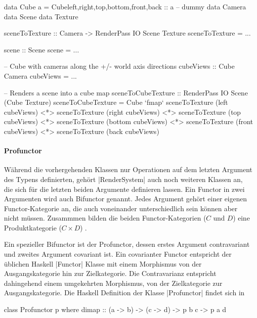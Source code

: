 \begin{haskell}[label={lst:rendersystem-applicative-beispiel},caption={Applicative RenderSystem Beispiel}]
data Cube a = Cube{left,right,top,bottom,front,back :: a}
-- dummy
data Camera
data Scene
data Texture

sceneToTexture :: Camera -> RenderPass IO Scene Texture
sceneToTexture = ...

scene :: Scene
scene = ...

-- Cube with cameras along the +/- world axis directions
cubeViews :: Cube Camera
cubeViews = ...

-- Renders a scene into a cube map
sceneToCubeTexture :: RenderPass IO Scene (Cube Texture)
sceneToCubeTexture = Cube
	`fmap` sceneToTexture (left cubeViews)
	<*> sceneToTexture (right  cubeViews)
	<*> sceneToTexture (top    cubeViews)
	<*> sceneToTexture (bottom cubeViews)
	<*> sceneToTexture (front  cubeViews)
	<*> sceneToTexture (back   cubeViews)
\end{haskell}



\paragraph{Profunctor}
Während die vorhergehenden Klassen nur Operationen auf dem letzten Argument des Typens definierten, gehört  |RenderSystem| auch noch weiteren Klassen an, die sich für die letzten beiden Argumente definieren lassen. Ein Functor in zwei Argumenten wird auch Bifunctor genannt. Jedes Argument gehört einer eigenen Functor-Kategorie an, die auch voneinander unterschiedlich sein können aber nicht müssen. Zusammmen bilden die beiden Functor-Kategorien ($C$ und $D$) eine Produktkategorie ($C \times D$) \parencite{MacLane1998}.

Ein spezieller Bifunctor ist der Profunctor, dessen erstes Argument contravariant und zweites Argument covariant ist. Ein covarianter Functor entspricht der üblichen Haskell |Functor| Klasse mit einem Morphismus von der Ausgangskategorie hin zur Zielkategorie. Die Contravarianz entspricht dahingehend einem umgekehrten Morphismus, von der Zielkategorie zur Ausgangskategorie. Die Haskell Definition der Klasse |Profunctor| findet sich in 

\begin{haskell}[label={lst:class-profunctor},caption={Profunctor Klasse\protect\footnotemark},nolol]
class Profunctor p where
  dimap :: (a -> b) -> (c -> d) -> p b c -> p a d
\end{haskell}

